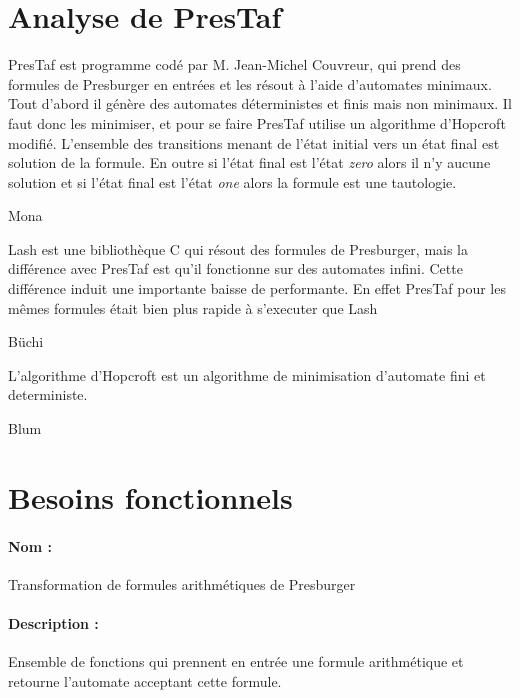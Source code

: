 \documentclass{article}%
\begin{document}
\section{Analyse de PresTaf}

PresTaf est programme codé par M. Jean-Michel Couvreur, qui prend des formules de Presburger en entrées et les résout à l'aide d'automates minimaux. Tout d'abord il génère des automates déterministes et finis mais non minimaux. Il faut donc les minimiser, et pour se faire PresTaf utilise un algorithme d'Hopcroft modifié. L'ensemble des transitions menant de l'état initial vers un état final est solution de la formule. En outre si l'état final est l'état \emph{zero} alors il n'y aucune solution et si l'état final est l'état \emph{one} alors la formule est une tautologie.\\\par

Mona\\\par

Lash\cite{lash} est une bibliothèque C qui résout des formules de Presburger, mais la différence avec PresTaf est qu'il fonctionne sur des automates infini. Cette différence induit une importante baisse de performante. En effet PresTaf pour les mêmes formules était bien plus rapide à s'executer que Lash\cite{DBLP:conf/wia/Couvreur04}\\\par

Büchi\\\par

L'algorithme d'Hopcroft est un algorithme de minimisation d'automate fini et deterministe.\\\par

Blum

\section{Besoins fonctionnels}

\paragraph{Nom :} Transformation de formules arithmétiques de Presburger

\paragraph{Description :} Ensemble de fonctions qui prennent en entrée une formule arithmétique et retourne l'automate acceptant cette formule.
\end{document}
